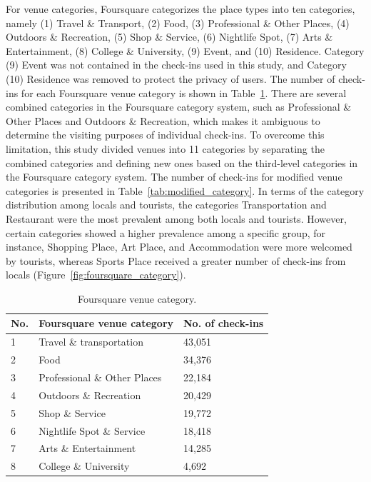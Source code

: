 \documentclass{article}
\theoremstyle{remark}
\begin{document}
For venue categories, Foursquare categorizes the place types into ten categories, namely (1) Travel \& Transport, (2) Food, (3) Professional \& Other Places, (4) Outdoors \& Recreation, (5) Shop \& Service, (6) Nightlife Spot, (7) Arts \& Entertainment, (8) College \& University, (9) Event, and (10) Residence. Category (9) Event was not contained in the check-ins used in this study, and Category (10) Residence was removed to protect the privacy of users. The number of check-ins for each Foursquare venue category is shown in Table~\ref{tab:foursquare_category}. There are several combined categories in the Foursquare category system, such as Professional \& Other Places and Outdoors \& Recreation, which makes it ambiguous to determine the visiting purposes of individual check-ins. To overcome this limitation, this study divided venues into 11 categories by separating the combined categories and defining new ones based on the third-level categories in the Foursquare category system. The number of check-ins for modified venue categories is presented in Table~\ref{tab:modified_category}. In terms of the category distribution among locals and tourists, the categories Transportation and Restaurant were the most prevalent among both locals and tourists. However, certain categories showed a higher prevalence among a specific group, for instance, Shopping Place, Art Place, and Accommodation were more welcomed by tourists, whereas Sports Place received a greater number of check-ins from locals (Figure~\ref{fig:foursquare_category}).

\begin{table}[h!]
\centering
\caption{\label{tab:foursquare_category}Foursquare venue category.}
\begin{tabular}{lll} \hline
No. & Foursquare venue category & No. of check-ins \\ \hline
1 & Travel \& transportation & 43,051 \\
2 & Food & 34,376 \\
3 & Professional \& Other Places & 22,184 \\
4 & Outdoors \& Recreation & 20,429 \\
5 & Shop \& Service & 19,772 \\
6 & Nightlife Spot \& Service & 18,418 \\
7 & Arts \& Entertainment & 14,285 \\
8 & College \& University & 4,692 \\ \hline
\end{tabular}
\end{table}
\end{document}
